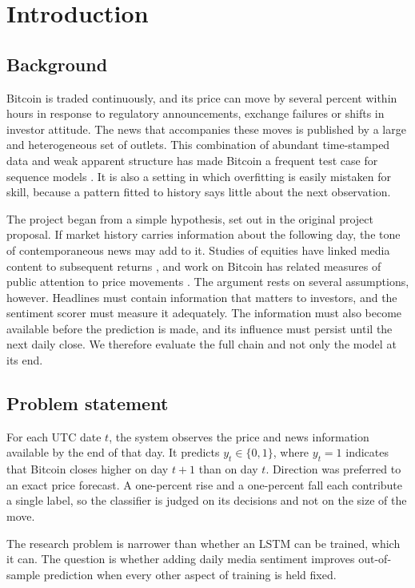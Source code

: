 \section{Introduction}
\label{ch:intro}
\subsection{Background}
Bitcoin is traded continuously, and its price can move by several percent within hours in response to regulatory announcements, exchange failures or shifts in investor attitude. The news that accompanies these moves is published by a large and heterogeneous set of outlets. This combination of abundant time-stamped data and weak apparent structure has made Bitcoin a frequent test case for sequence models \cite{sezer2020,fischer2018}. It is also a setting in which overfitting is easily mistaken for skill, because a pattern fitted to history says little about the next observation.

The project began from a simple hypothesis, set out in the original project proposal. If market history carries information about the following day, the tone of contemporaneous news may add to it. Studies of equities have linked media content to subsequent returns \cite{tetlock2007}, and work on Bitcoin has related measures of public attention to price movements \cite{kristoufek2013}. The argument rests on several assumptions, however. Headlines must contain information that matters to investors, and the sentiment scorer must measure it adequately. The information must also become available before the prediction is made, and its influence must persist until the next daily close. We therefore evaluate the full chain and not only the model at its end.

\subsection{Problem statement}
For each UTC date $t$, the system observes the price and news information available by the end of that day. It predicts $y_t \in \{0,1\}$, where $y_t=1$ indicates that Bitcoin closes higher on day $t+1$ than on day $t$. Direction was preferred to an exact price forecast. A one-percent rise and a one-percent fall each contribute a single label, so the classifier is judged on its decisions and not on the size of the move.

The research problem is narrower than whether an LSTM can be trained, which it can. The question is whether adding daily media sentiment improves out-of-sample prediction when every other aspect of training is held fixed.

